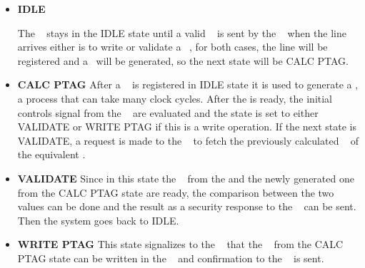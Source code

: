 \begin{itemize}
  \item{\textbf{IDLE}}
 
The \seceng ~ stays in the IDLE  state until a valid \sline~ is sent by the \handler~ when the line arrives either is to write or validate a \ptag~, for both cases, the line will be registered and a \ptag~will be generated, so the next state will be CALC PTAG. 
 
  \item{\textbf{CALC PTAG}}
  After a \sline~ is registered in IDLE state it is used to generate a \ptag, a process that can take many clock cycles. After the \ptag is ready, the initial controls signal from the \handler~ are evaluated and the state is set to either VALIDATE or  WRITE PTAG if this is a write operation. If the next state is  VALIDATE, a request is made to the \pmmu~ to fetch the previously calculated \ptag ~ of the equivalent \sline.
  

  \item{\textbf{VALIDATE}}
  Since in this state the \ptag~ from the \ptagmem and the newly generated one from the CALC PTAG state are ready, the comparison between the two values can be done and the result as a security response to the \handler~ can be sent. Then the system goes back to IDLE.
  

 \item{\textbf{WRITE PTAG}}
  This state signalizes to the \pmmu~  that the \ptag~ from the CALC PTAG state can be written in the \ptagmem~ and confirmation to the \handler~ is sent.
\end{itemize}


